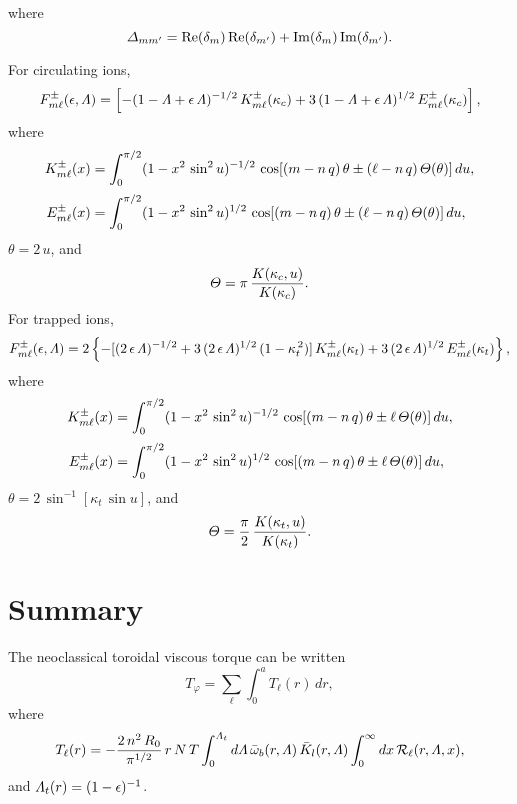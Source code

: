\documentclass[12pt,prb,aps,notitlepage]{revtex4-1}
\begin{document}
where
\begin{equation}
{\mit\Delta}_{mm'} = {\rm Re}(\delta_m)\,{\rm Re}(\delta_{m'})+ {\rm Im}(\delta_m)\,{\rm Im}(\delta_{m'}).
\end{equation}

For circulating ions,
\begin{align}
F_{m\ell}^\pm(\epsilon,{\mit\Lambda}) = \left[-(1-{\mit\Lambda}+\epsilon\,{\mit\Lambda})^{-1/2}\,K^\pm_{m\ell}(\kappa_c) + 3\,(1-{\mit\Lambda}+\epsilon\,{\mit\Lambda})^{1/2}\,
E^\pm_{m\ell}(\kappa_c)\right],
\end{align}
where
\begin{align}
K^\pm_{m\ell}(x) &= \int_0^{\pi/2} (1-x^2\,\sin^2 u)^{-1/2}\,\cos[(m-n\,q)\,\theta \pm (\ell -n\,q)\,{\mit\Theta}(\theta)]\,du,\\[0.5ex]
E^\pm_{m\ell}(x) &= \int_0^{\pi/2} (1-x^2\,\sin^2 u)^{1/2}\,\cos[(m-n\,q)\,\theta \pm (\ell -n\,q)\,{\mit\Theta}(\theta)]\,du,
\end{align}
 $\theta=2\,u$, and
 \begin{equation}
 {\mit\Theta} = \pi\,\frac{K(\kappa_c,u)}{K(\kappa_c)}.
 \end{equation}
 For trapped ions,
\begin{align}
F_{m\ell}^\pm(\epsilon,{\mit\Lambda}) = 2\left\{-[(2\,\epsilon\,{\mit\Lambda})^{-1/2}+3\,(2\,\epsilon\,{\mit\Lambda})^{1/2}\,(1-\kappa_t^{\,2})]\,K^\pm_{m\ell}(\kappa_t) + 3\,(2\,\epsilon\,{\mit\Lambda})^{1/2}\,E^\pm_{m\ell}(\kappa_t)\right\},
\end{align}
where 
\begin{align}
K^\pm_{m\ell}(x) &= \int_0^{\pi/2} (1-x^2\,\sin^2 u)^{-1/2}\,\cos[(m-n\,q)\,\theta \pm \ell\,{\mit\Theta}(\theta)]\,du,\\[0.5ex]
E^\pm_{m\ell}(x) &= \int_0^{\pi/2} (1-x^2\,\sin^2 u)^{1/2}\,\cos[(m-n\,q)\,\theta \pm \ell \,{\mit\Theta}(\theta)]\,du,
\end{align}
 $\theta=2\,\sin^{-1}[\kappa_t\,\sin u]$, and
\begin{equation}
{\mit\Theta}= \frac{\pi}{2}\,\frac{K(\kappa_t,u)}{K(\kappa_t)}.
\end{equation}

\section{Summary}
The neoclassical toroidal viscous torque can be written
\begin{equation}
T_\varphi = \sum_{\ell} \int_0^a T_\ell(r)\,dr,
\end{equation}
where
\begin{equation}
T_\ell(r) = -\frac{2\,n^2\,R_0}{\pi^{1/2}}\,r\,N\,T\int_0^{{\mit\Lambda}_t}d{\mit\Lambda}\,\bar{\omega}_b(r,{\mit\Lambda})\,\bar{K}_l(r,{\mit\Lambda})\int_0^\infty dx\,{\cal R}_\ell(r,{\mit\Lambda},x),
\end{equation}
and ${\mit\Lambda}_t(r)=(1-\epsilon)^{-1}$. 
\end{document}
